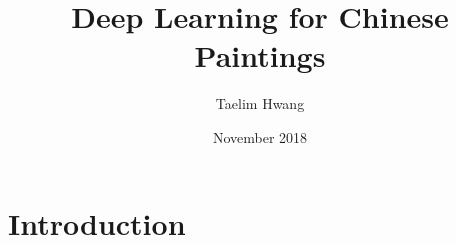 \documentclass{article}
\title{Deep Learning for Chinese Paintings}
\author{Taelim Hwang}
\date{November 2018}
\begin{document}
\maketitle

\section{Introduction}
\end{document}
